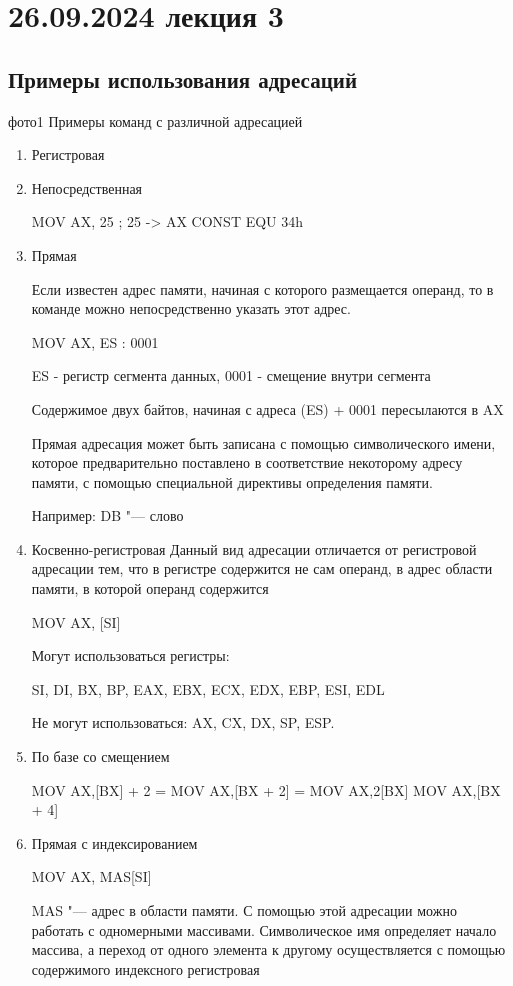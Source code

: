 \section{26.09.2024 лекция 3}
\subsection{Примеры использования адресаций}
фото1
Примеры команд с различной адресацией
\begin{enumerate}
    \item Регистровая
    \item Непосредственная

    MOV AX, 25 ; 25 -> AX
    CONST EQU 34h
    \item Прямая
    
    Если известен адрес памяти, начиная с которого размещается операнд, то в команде можно непосредственно указать этот адрес.
    
    MOV AX, ES : 0001

    ES - регистр сегмента данных, 0001 - смещение внутри сегмента

    Содержимое двух байтов, начиная с адреса (ES) + 0001 пересылаются в AX 

    Прямая адресация может быть записана с помощью символического имени, которое предварительно поставлено в соответствие некоторому адресу памяти, с помощью специальной директивы определения памяти.

    Например: DB "--- слово

    \item Косвенно-регистровая
    Данный вид адресации отличается от регистровой адресации тем, что в регистре содержится не сам операнд, в адрес области памяти, в которой операнд содержится

    MOV AX, [SI]

    Могут использоваться регистры:

    SI, DI, BX, BP, EAX, EBX, ECX, EDX, EBP, ESI, EDL

    Не могут использоваться: AX, CX, DX, SP, ESP.

    \item По базе со смещением
    
    MOV AX,[BX] + 2
    = MOV AX,[BX + 2]
    = MOV AX,2[BX]
    MOV AX,[BX + 4]

    \item Прямая с индексированием

    MOV AX, MAS[SI]

    MAS "--- адрес в области памяти.
    С помощью этой адресации можно работать с одномерными массивами. Символическое имя определяет начало массива, а переход от одного элемента к другому осуществляется с помощью содержимого индексного регистровая


\end{enumerate}
